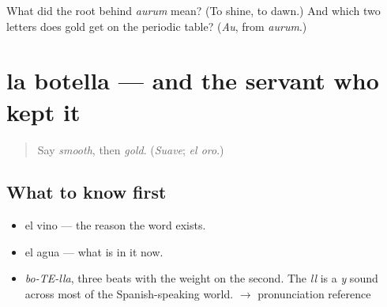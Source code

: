 \begin{tcolorbox}[breakable,colback=teal!4,colframe=teal!35!black,title={Before you move on}]
What did the root behind \emph{aurum} mean? (To shine, to dawn.) And which two letters does gold get on the periodic table? (\emph{Au}, from \emph{aurum}.)
\end{tcolorbox}
\section[la botella]{la botella — and the servant who kept it}

\label{lesson:ES-C373-botella}



\begin{quote}
Say \emph{smooth}, then \emph{gold}. (\emph{Suave}; \emph{el oro}.)
\end{quote}

\subsection*{What to know first}
\begin{itemize}
\raggedright
  \item el vino — the reason the word exists.
  \item el agua — what is in it now.
\end{itemize}

\begin{sounds}
\begin{itemize}
\raggedright
  \item \emph{bo-TE-lla}, three beats with the weight on the second. The \emph{ll} is a \emph{y} sound across most of the Spanish-speaking world. $\to$ pronunciation reference
\end{itemize}
\end{sounds}

